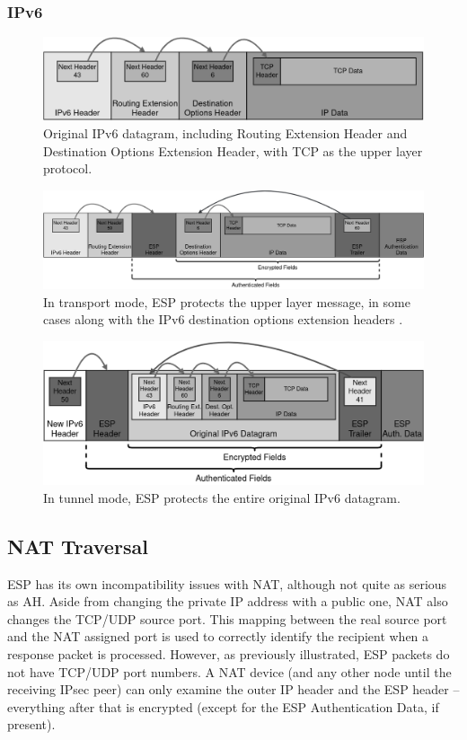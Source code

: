\documentclass[a4paper,12pt]{report}
\begin{document}
		\subsubsection{IPv6}
		\begin{figure}[!htb]
			\includegraphics[width=\textwidth,height=0.15\textheight,keepaspectratio]{original_ipv6_packet}
			\centering
			\caption{Original IPv6 datagram, including Routing Extension Header and Destination Options Extension Header, with TCP as the upper layer protocol.}
		\end{figure}
		
		\begin{figure}[!htb]
			\includegraphics[width=\textwidth]{esp_ipv6_transport}
			\centering
			\caption{In transport mode, ESP protects the upper layer message, in some cases along with the IPv6 destination options extension headers \cite{rfc4303}.}
		\end{figure}
		
		\begin{figure}[!htb]
			\includegraphics[width=\textwidth]{esp_ipv6_tunnel}
			\centering
			\caption{In tunnel mode, ESP protects the entire original IPv6 datagram.}
		\end{figure}
	\newpage
		\subsection{NAT Traversal}
		ESP has its own incompatibility issues with NAT, although not quite as serious as AH. Aside from changing the private IP address with a public one, NAT also changes the TCP/UDP source port. This mapping between the real source port and the NAT assigned port is used to correctly identify the recipient when a response packet is processed. However, as previously illustrated, ESP packets do not have TCP/UDP port numbers. A NAT device (and any other node until the receiving IPsec peer) can only examine the outer IP header and the ESP header -- everything after that is encrypted (except for the ESP Authentication Data, if present).
		
\end{document}
